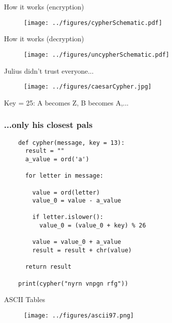 \documentclass[xcolor=dvipsnames]{beamer}
\begin{document}
\begin{frame}{How it works (encryption)}
  \begin{figure}
    \centering
    \texttt{[image: ../figures/cypherSchematic.pdf]}
  \end{figure}
\end{frame}


\begin{frame}{How it works (decryption)}
  \begin{figure}
    \centering
    \texttt{[image: ../figures/uncypherSchematic.pdf]}
  \end{figure}
\end{frame}


\begin{frame}{Julius didn't trust everyone...}
  \begin{figure}
    \centering
    \texttt{[image: ../figures/caesarCypher.jpg]}
  \end{figure}
  \begin{center}
    Key = 25: A becomes Z, B becomes A,...
  \end{center}
\end{frame}


\begin{frame}[fragile]
  \frametitle{...only his closest pals}
  \begin{lstlisting}
    def cypher(message, key = 13):
      result = ""
      a_value = ord('a')

      for letter in message:

        value = ord(letter)
        value_0 = value - a_value

        if letter.islower():
          value_0 = (value_0 + key) % 26

        value = value_0 + a_value
        result = result + chr(value)

      return result

    print(cypher("nyrn vnpgn rfg"))
  \end{lstlisting}
\end{frame}


\begin{frame}{ASCII Tables}
  \begin{figure}
    \centering
    \texttt{[image: ../figures/ascii97.png]}
  \end{figure}
\end{frame}
\end{document}
